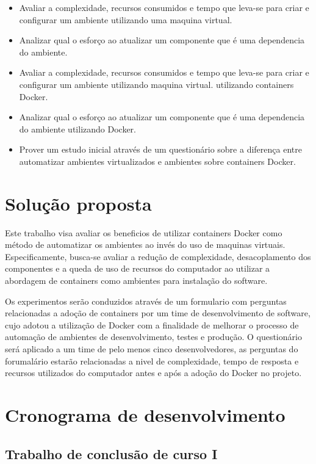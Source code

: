 \documentclass[11pt,a4paper]{article}
\begin{document}
\begin{itemize}
  \item Avaliar a complexidade, recursos consumidos e tempo que leva-se para criar e configurar um ambiente
    utilizando uma maquina virtual.
  \item Analizar qual o esforço ao atualizar um componente que é uma dependencia do ambiente.
  \item Avaliar a complexidade, recursos consumidos e tempo que leva-se para criar e configurar um ambiente
    utilizando maquina virtual.
    utilizando containers Docker.
  \item Analizar qual o esforço ao atualizar um componente que é uma dependencia do ambiente utilizando Docker.
  \item Prover um estudo inicial através de um questionário sobre a diferença entre automatizar
    ambientes virtualizados e ambientes sobre containers Docker.
\end{itemize}

\section{Solução proposta}

Este trabalho visa avaliar os beneficios de utilizar containers Docker como método de automatizar os ambientes
ao invés do uso de maquinas virtuais. Especificamente, busca-se avaliar a redução de complexidade, desacoplamento dos
componentes e a queda de uso de recursos do computador ao utilizar a abordagem de containers como ambientes para instalação
do software.

Os experimentos serão conduzidos através de um formulario com perguntas relacionadas a adoção de containers por um time
de desenvolvimento de software, cujo adotou a utilização de Docker com a finalidade de melhorar o processo de automação
de ambientes de desenvolvimento, testes e produção. O questionário será aplicado a um time de pelo menos cinco desenvolvedores,
as perguntas do forumalário estarão relacionadas a nivel de complexidade, tempo de resposta e recursos utilizados do computador
antes e após a adoção do Docker no projeto.

\section{Cronograma de desenvolvimento}\label{sec:cronograma}

\subsection{Trabalho de conclusão de curso I}
\end{document}
